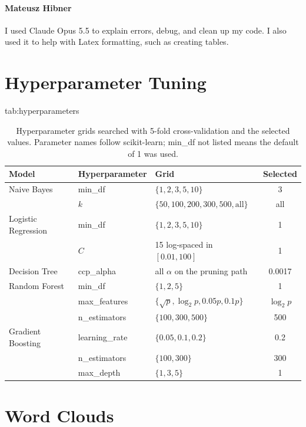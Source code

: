 \documentclass[pmlr]{jmlr}%
\begin{document}
\paragraph{Mateusz Hibner}
I used Claude Opus 5.5 to explain errors, debug, and clean up my code. I also used it to help with Latex formatting, such as creating tables.
\appendix

\section{Hyperparameter Tuning}\label{apd:first}

\begin{table}[H]
\floatconts
  {tab:hyperparameters}%
  {\caption{Hyperparameter grids searched with 5-fold cross-validation and the selected values. Parameter names follow scikit-learn; min\_df not listed means the default of 1 was used.}}%
  {\begin{tabular}{lllc}
  \toprule
  \bfseries Model & \bfseries Hyperparameter & \bfseries Grid & \bfseries Selected\\
  \midrule
  Naive Bayes & min\_df & $\{1, 2, 3, 5, 10\}$ & 3\\
   & $k$ & $\{50, 100, 200, 300, 500, \text{all}\}$ & all\\
  \midrule
  Logistic Regression & min\_df & $\{1, 2, 3, 5, 10\}$ & 1\\
   & $C$ & 15 log-spaced in $[0.01, 100]$ & 1\\
  \midrule
  Decision Tree & ccp\_alpha & all $\alpha$ on the pruning path & 0.0017\\
  \midrule
  Random Forest & min\_df & $\{1, 2, 5\}$ & 1\\
   & max\_features & $\{\sqrt{p}, \log_2 p, 0.05p, 0.1p\}$ & $\log_2 p$\\
   & n\_estimators & $\{100, 300, 500\}$ & 500\\
  \midrule
  Gradient Boosting & learning\_rate & $\{0.05, 0.1, 0.2\}$ & 0.2\\
   & n\_estimators & $\{100, 300\}$ & 300\\
   & max\_depth & $\{1, 3, 5\}$ & 1\\
  \bottomrule
  \end{tabular}}
\end{table}

\section{Word Clouds}
\label{app:wordclouds}
\end{document}
